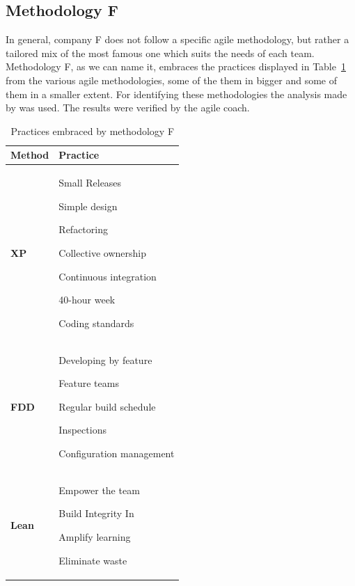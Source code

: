 \subsection{Methodology F}
In general, company F does not follow a specific agile methodology, but rather a tailored mix of the most famous one which suits the needs of each team. Methodology F, as we can name it, embraces the practices displayed in Table~\ref{table:methodologyF_practices} from the various agile methodologies, some of the them in bigger and some of them in a smaller extent. For identifying these methodologies the analysis made by \citet{koch2005agile} was used. The results were verified by the agile coach.

\begin{table} [H]
\caption{Practices embraced by methodology F}
\begin{tabular}{| p{2cm} | p{13cm}|}
    \hline
     \textbf{Method} & \textbf{Practice} \\ \hline
     \textbf{XP}  & \begin{inparaenum} [a\upshape)]
     				\item Small Releases \item Simple design \item Refactoring \item Collective ownership \item Continuous integration \item 40-hour week \item Coding standards
					\end{inparaenum}      \\ \hline
     \textbf{FDD}  & \begin{inparaenum} [a\upshape)]  \item Developing by feature \item Feature teams \item Regular build schedule \item Inspections \item Configuration management
     				  \end{inparaenum}\\ \hline
     \textbf{Lean} & \begin{inparaenum} [a\upshape)] \item Empower the team \item Build Integrity In \item Amplify learning \item Eliminate waste
     				 \end{inparaenum} \\ \hline
\end{tabular}
\label{table:methodologyF_practices}
\end{table}

